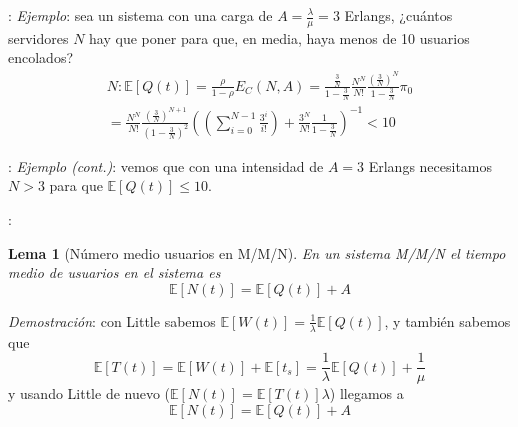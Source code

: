 \documentclass[xcolor={x11names}]{beamer}
\newtheorem{lema}{Lema}[section]
\begin{document}
\begin{frame}{\secname: \subsecname}
    \textit{Ejemplo}: sea un sistema con una
    carga de $A=\tfrac{\lambda}{\mu}=3$
    Erlangs, ¿cuántos servidores $N$ hay
    que poner para que, en media,
    haya menos de 10
    usuarios encolados?
    \begin{multline*}
        N:\mathbb{E}[Q(t)]=
        \frac{\rho}{1-\rho}E_C(N,A)
        = \frac{\tfrac{3}{N}}{1-\tfrac{3}{N}}
        \frac{N^N}{N!}\frac{\left(\frac{3}{N}\right)^N}{1-\tfrac{3}{N}}\pi_0\\
        =\frac{N^N}{N!}\frac{\left(\frac{3}{N}\right)^{N+1}}{\left(1-\tfrac{3}{N}\right)^2}
                \left(
                    \left(\sum_{i=0}^{N-1}
                    \frac{3^i}{i!}
                    \right)
                    + \frac{3^N}{N!}\frac{1}{1-\tfrac{3}{N}}
                \right)^{-1}<10
    \end{multline*}
\end{frame}





\begin{frame}{\secname: \subsecname}
    \textit{Ejemplo (cont.)}: vemos que con
    una intensidad de $A=3$ Erlangs necesitamos
    $N>3$ para que $\mathbb{E}[Q(t)]\leq 10$.
    \vfill
    \begin{figure}
        
    \end{figure}
\end{frame}





\begin{frame}{\secname: \subsecname}
    \begin{lema}[Número medio usuarios en M/M/N]
        En un sistema M/M/N el tiempo medio
        de usuarios en el sistema es
        \begin{equation}
            \mathbb{E}[N(t)]=
            \mathbb{E}[Q(t)]+A
        \end{equation}
    \end{lema}
    \vfill
    \textit{Demostración}:
    con Little sabemos
    $\mathbb{E}[W(t)]=\tfrac{1}{\lambda}
    \mathbb{E}[Q(t)]$, y también sabemos que
    \begin{equation*}
        \mathbb{E}[T(t)]
        =\mathbb{E}[W(t)]+\mathbb{E}[t_s]
        = \frac{1}{\lambda}\mathbb{E}[Q(t)]
        + \frac{1}{\mu}
    \end{equation*}
    y usando Little de nuevo
    ($\mathbb{E}[N(t)]=\mathbb{E}[T(t)]\lambda$)
    llegamos a
    \begin{equation*}
        \mathbb{E}[N(t)]=
        \mathbb{E}[Q(t)]+A
    \end{equation*}
\end{frame}
\end{document}
